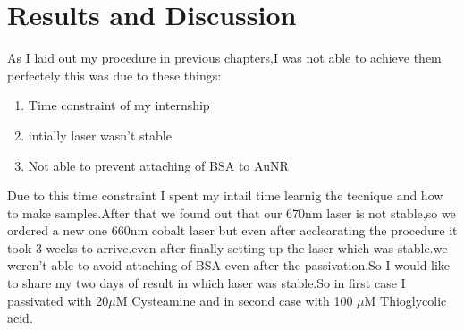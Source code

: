 \documentclass[twoside,single]{lion-msc}
\begin{document}
\chapter{Results and Discussion}

As I laid out my procedure in previous chapters,I was not able to achieve them perfectely this was due to these things:
\begin{enumerate}
\item Time constraint of my internship
\item intially laser wasn't stable
\item Not able to prevent attaching of BSA to AuNR
\end{enumerate}
Due to this time constraint I spent my intail time learnig the tecnique and how to make samples.After that we found out that our 670nm laser is not stable,so we ordered a new one 660nm cobalt laser but even after acclearating the procedure it took 3 weeks to arrive.even after finally setting up the laser which was stable.we weren't able to avoid attaching of BSA even after the passivation.So I would like to share my two days of result in which laser was stable.So in first case I passivated with 20$\mu$M Cysteamine and in second case with 100 $\mu$M Thioglycolic acid.
\end{document}
